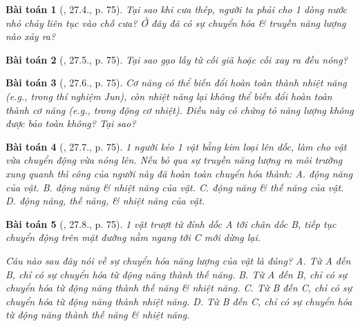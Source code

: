 \documentclass{article}
\newtheorem{baitoan}{Bài toán}
\begin{document}
\begin{baitoan}[\cite{SBT_Vat_Ly_8}, 27.4., p. 75]
	Tại sao khi cưa thép, người ta phải cho 1 dòng nước nhỏ chảy liên tục vào chỗ cưa? Ở đây đã có sự chuyển hóa \& truyền năng lượng nào xảy ra?
\end{baitoan}

\begin{baitoan}[\cite{SBT_Vat_Ly_8}, 27.5., p. 75]
	Tại sao gạo lấy từ cối giã hoặc cối xay ra đều nóng?
\end{baitoan}

\begin{baitoan}[\cite{SBT_Vat_Ly_8}, 27.6., p. 75]
	Cơ năng có thể biến đổi hoàn toàn thành nhiệt năng (e.g., trong thí nghiệm Jun), còn nhiệt năng lại không thể biến đổi hoàn toàn thành cơ năng (e.g., trong động cơ nhiệt). Điều này có chứng tỏ năng lượng không được bảo toàn không? Tại sao?
\end{baitoan}

\begin{baitoan}[\cite{SBT_Vat_Ly_8}, 27.7., p. 75]
	1 người kéo 1 vật bằng kim loại lên dốc, làm cho vật vừa chuyển động vừa nóng lên. Nếu bỏ qua sự truyền năng lượng ra môi trường xung quanh thì công của người này đã hoàn toàn chuyển hóa thành: {\sf A.} động năng của vật. {\sf B.} động năng \& nhiệt năng của vật. {\sf C.} động năng \& thế năng của vật. {\sf D.} động năng, thế năng, \& nhiệt năng của vật.
\end{baitoan}

\begin{baitoan}[\cite{SBT_Vat_Ly_8}, 27.8., p. 75]
	1 vật trượt từ đỉnh dốc A tới chân dốc B, tiếp tục chuyển động trên mặt đường nằm ngang tới C mới dừng lại. 
	\begin{center}
	\end{center}
	Câu nào sau đây nói về sự chuyển hóa năng lượng của vật là đúng? {\sf A.} Từ A đến B, chỉ có sự chuyển hóa từ động năng thành thế năng. {\sf B.} Từ A đến B, chỉ có sự chuyển hóa từ động năng thành thế năng \& nhiệt năng. {\sf C.} Từ B đến C, chỉ có sự chuyển hóa từ động năng thành nhiệt năng. {\sf D.} Từ B đến C, chỉ có sự chuyển hóa từ động năng thành thế năng \& nhiệt năng.
\end{baitoan}
\end{document}
